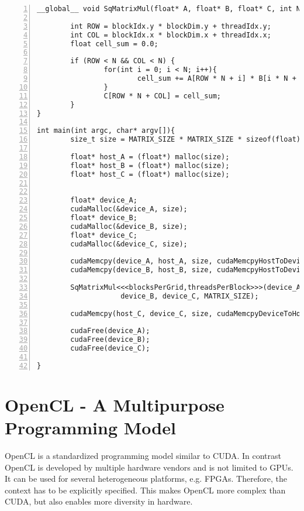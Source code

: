 \documentclass[a4paper,12pt]{llncs}
\numberwithin{equation}{section}
\begin{document}
\begin{lstlisting}[style=cpp,caption={Kernel Function of Matrix Multiplication},label={lst:CUDA_EX},numbers=left]
__global__ void SqMatrixMul(float* A, float* B, float* C, int N) {

        int ROW = blockIdx.y * blockDim.y + threadIdx.y;
        int COL = blockIdx.x * blockDim.x + threadIdx.x;
        float cell_sum = 0.0;

        if (ROW < N && COL < N) {
                for(int i = 0; i < N; i++){
                        cell_sum += A[ROW * N + i] * B[i * N + COL];
                }
                C[ROW * N + COL] = cell_sum;
        }
}

int main(int argc, char* argv[]){
        size_t size = MATRIX_SIZE * MATRIX_SIZE * sizeof(float);
        
        float* host_A = (float*) malloc(size);
        float* host_B = (float*) malloc(size);
        float* host_C = (float*) malloc(size);


        float* device_A;
        cudaMalloc(&device_A, size);
        float* device_B;
        cudaMalloc(&device_B, size);
        float* device_C;
        cudaMalloc(&device_C, size);

        cudaMemcpy(device_A, host_A, size, cudaMemcpyHostToDevice);
        cudaMemcpy(device_B, host_B, size, cudaMemcpyHostToDevice);

        SqMatrixMul<<<blocksPerGrid,threadsPerBlock>>>(device_A, 
        			device_B, device_C, MATRIX_SIZE);
       
        cudaMemcpy(host_C, device_C, size, cudaMemcpyDeviceToHost);

        cudaFree(device_A);
        cudaFree(device_B);
        cudaFree(device_C);

}
\end{lstlisting}



 
\section{OpenCL - A Multipurpose Programming Model}
  OpenCL is a standardized programming model similar to CUDA.
  In contrast OpenCL is developed by multiple hardware vendors and is not limited to GPUs.
  It can be used for several heterogeneous platforms, e.g. FPGAs.
  Therefore, the context has to be explicitly specified.
  This makes OpenCL more complex than CUDA, but also enables more diversity in hardware.~\cite{Rauber.2012}
\end{document}
